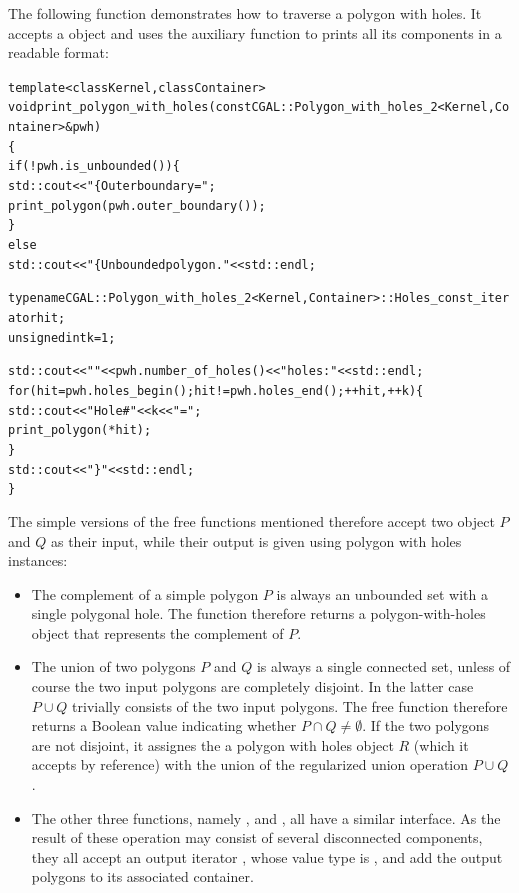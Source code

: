The following function demonstrates how to traverse a polygon with holes.
It accepts a  object and uses the auxiliary
function  to prints all its components in a readable
format:
\begin{alltt}
template<class Kernel, class Container>
void print_polygon_with_holes(const CGAL::Polygon_with_holes_2<Kernel, Container> & pwh)
\{
  if (! pwh.is_unbounded()) \{
    std::cout << "\{ Outer boundary = "; 
    print_polygon (pwh.outer_boundary());
  \}
  else
    std::cout << "\{ Unbounded polygon." << std::endl;

  typename CGAL::Polygon_with_holes_2<Kernel,Container>::Holes_const_iterator hit;
  unsigned int k = 1;

  std::cout << "  " << pwh.number_of_holes() << " holes:" << std::endl;
  for (hit = pwh.holes_begin(); hit != pwh.holes_end(); ++hit, ++k) \{
    std::cout << "    Hole #" << k << " = ";
    print_polygon (*hit);
  \}
  std::cout << " \}" << std::endl;
\}
\end{alltt}

The simple versions of the free functions mentioned therefore
accept two  object $P$ and $Q$ as their input, while
their output is given using polygon with holes instances:
\begin{itemize}
\item The complement of a simple polygon $P$ is always an unbounded set
with a single polygonal hole. The function  therefore
returns a polygon-with-holes object that represents the complement of $P$.
\item The union of two polygons $P$ and $Q$ is always a single connected
set, unless of course the two input polygons are completely disjoint. In
the latter case $P \cup Q$ trivially consists of the two input polygons.
The free function  therefore returns a Boolean value
indicating whether $P \cap Q \neq \emptyset$. If the two polygons are not
disjoint, it assignes the a polygon with holes object $R$ (which it
accepts by reference) with the union of the regularized union operation
$P \cup Q$.
\item The other three functions, namely , 
 and , all
have a similar interface. As the result of these operation may consist
of several disconnected components, they all accept an output iterator
, whose value type is , and add the
output polygons to its associated container.
\end{itemize}

